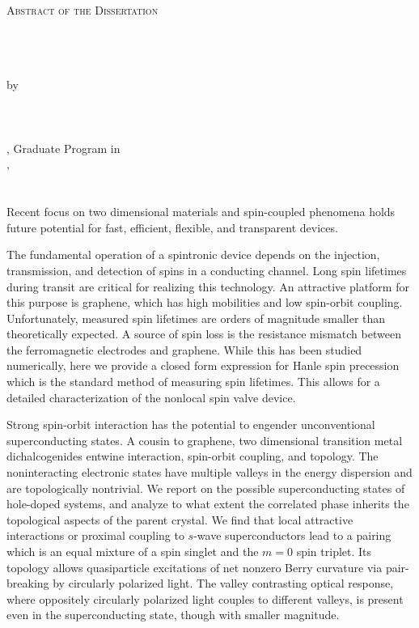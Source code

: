 \clearpage
\centering
\vspace*{-\toptafiddle}

\textsc{Abstract of the Dissertation} \\~\\

\SingleSpacing{}

\thetitle{} \\~\\
by \\~\\
\theauthor{} \\~\\

\thedegree, Graduate Program in \thefield{} \\
\theuniversity{}, \thedate{} \\
\thechair{} \\~\\

\justify{}
\DoubleSpacing{}
Recent focus on two dimensional materials and spin-coupled phenomena
holds future potential for fast, efficient, flexible, and transparent devices.

The fundamental operation of a spintronic device
depends on the injection, transmission, and detection
of spins in a conducting channel.
Long spin lifetimes during transit are critical for realizing this technology.
An attractive platform for this purpose is graphene, which has high mobilities
and low spin-orbit coupling.
Unfortunately, measured spin lifetimes are orders of magnitude smaller
than theoretically expected.
A source of spin loss is the resistance mismatch between
the ferromagnetic electrodes and graphene.
While this has been studied numerically,
here we provide a closed form expression for Hanle spin precession
which is the standard method of measuring spin lifetimes.
This allows for a detailed characterization of the nonlocal spin valve device.

Strong spin-orbit interaction has the potential
to engender unconventional superconducting states.
A cousin to graphene, two dimensional transition metal dichalcogenides
entwine interaction, spin-orbit coupling, and topology.
The noninteracting electronic states have
multiple valleys in the energy dispersion
and are topologically nontrivial.
We report on the possible superconducting states
of hole-doped systems, and analyze to what extent the correlated phase
inherits the topological aspects of the parent crystal.
We find that local attractive interactions or proximal coupling to
$s$-wave superconductors lead to a pairing
which is an equal mixture of a spin singlet and the $m = 0$ spin triplet.
Its topology allows quasiparticle excitations
of net nonzero Berry curvature via pair-breaking by circularly polarized light.
The valley contrasting optical response,
where oppositely circularly polarized light couples to different valleys,
is present even in the superconducting state, though with smaller magnitude.

\enlargethispage{\bottafiddle}
\clearpage

